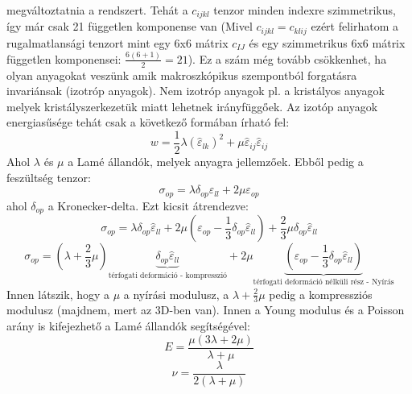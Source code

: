 \documentclass[a4paper,12pt]{article}
\begin{document}
megváltoztatnia a rendszert. Tehát a $c_{ijkl}$ tenzor minden indexre szimmetrikus, így már csak 21 független komponense van (Mivel $c_{ijkl} = c_{klij}$ ezért felirhatom a rugalmatlansági tenzort mint egy 6x6 mátrix $c_{IJ}$ és egy szimmetrikus 6x6 mátrix független komponensei: $\frac{6(6 + 1)}{2} = 21$).
Ez a szám még tovább csökkenhet, ha olyan anyagokat veszünk amik makroszkópikus szempontból forgatásra invariánsak (izotróp anyagok). Nem izotróp anyagok pl. a kristályos anyagok melyek kristályszerkezetük miatt lehetnek irányfüggőek.
Az izotóp anyagok energiasűsége tehát csak a következő formában írható fel:
\begin{equation}
    w = \frac{1}{2} \lambda (\hat{\varepsilon}_{lk})^2 + \mu \hat{\varepsilon}_{ij} \hat{\varepsilon}_{ij}
\end{equation}
Ahol $\lambda$ és $\mu$ a Lamé állandók, melyek anyagra jellemzőek. Ebből pedig a feszültség tenzor:
\begin{equation}
    \sigma_{op} = \lambda \delta_{op} \varepsilon_{ll} + 2 \mu \varepsilon_{op}
\end{equation}
ahol $\delta_{op}$ a Kronecker-delta. Ezt kicsit átrendezve:
\begin{equation}
    \sigma_{op} = \lambda \delta_{op} \hat{\varepsilon}_{ll} + 2 \mu \left(\varepsilon_{op} - \frac{1}{3} \delta_{op} \hat{\varepsilon}_{ll}\right) + \frac{2}{3} \mu \delta_{op} \hat{\varepsilon}_{ll}
\end{equation}
\begin{equation}
    \sigma_{op} = \left(\lambda + \frac{2}{3} \mu\right) \underbrace{\delta_{op} \hat{\varepsilon}_{ll}}_{\text{térfogati deformáció - kompresszió}} + 2 \mu \underbrace{\left(\varepsilon_{op} - \frac{1}{3} \delta_{op} \hat{\varepsilon}_{ll}\right)}_{\text{térfogati deformáció nélküli rész - Nyírás}}
\end{equation}
Innen látszik, hogy a $\mu$ a nyírási modulusz, a $\lambda + \frac{2}{3} \mu$ pedig a kompressziós modulusz (majdnem, mert az 3D-ben van).
Innen a Young modulus és a Poisson arány is kifejezhető a Lamé állandók segítségével:
\begin{equation}
    E = \frac{\mu (3 \lambda + 2 \mu)}{\lambda + \mu}
\end{equation}
\begin{equation}
    \nu = \frac{\lambda}{2(\lambda + \mu)}
\end{equation}
\end{document}
